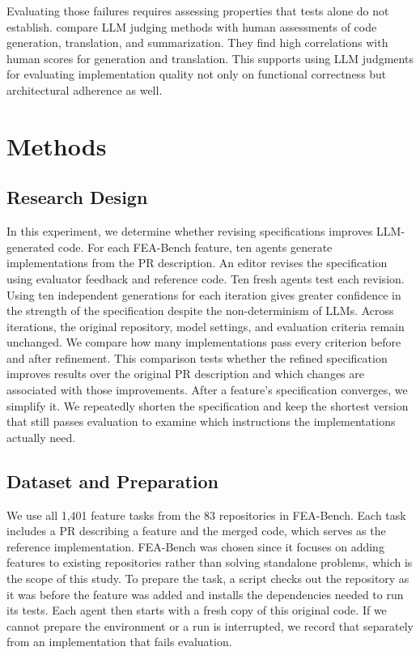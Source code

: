 \documentclass[sigconf,nonacm]{acmart}
\begin{document}
Evaluating those failures requires assessing properties that tests alone do not establish. \citet{wang2025} compare LLM judging methods with human assessments of code generation, translation, and summarization. They find high correlations with human scores for generation and translation. This supports using LLM judgments for evaluating implementation quality not only on functional correctness but architectural adherence as well.

\section{Methods}

\subsection{Research Design}

In this experiment, we determine whether revising specifications improves LLM-generated code. For each FEA-Bench feature, ten agents generate implementations from the PR description. An editor revises the specification using evaluator feedback and reference code. Ten fresh agents test each revision. Using ten independent generations for each iteration gives greater confidence in the strength of the specification despite the non-determinism of LLMs. Across iterations, the original repository, model settings, and evaluation criteria remain unchanged. We compare how many implementations pass every criterion before and after refinement. This comparison tests whether the refined specification improves results over the original PR description and which changes are associated with those improvements. After a feature's specification converges, we simplify it. We repeatedly shorten the specification and keep the shortest version that still passes evaluation to examine which instructions the implementations actually need.

\subsection{Dataset and Preparation}

We use all 1,401 feature tasks from the 83 repositories in FEA-Bench. Each task includes a PR describing a feature and the merged code, which serves as the reference implementation. FEA-Bench was chosen since it focuses on adding features to existing repositories rather than solving standalone problems, which is the scope of this study. To prepare the task, a script checks out the repository as it was before the feature was added and installs the dependencies needed to run its tests. Each agent then starts with a fresh copy of this original code. If we cannot prepare the environment or a run is interrupted, we record that separately from an implementation that fails evaluation.
\end{document}
